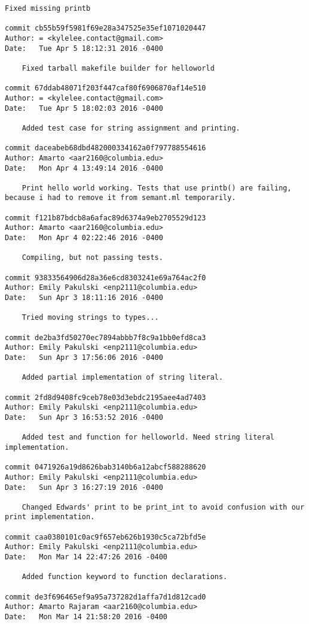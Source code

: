 \begin{lstlisting}[backgroundcolor=\color{white}]
    Fixed missing printb

commit cb55b59f5981f69e28a347525e35ef1071020447
Author: = <kylelee.contact@gmail.com>
Date:   Tue Apr 5 18:12:31 2016 -0400

    Fixed tarball makefile builder for helloworld

commit 67ddab48071f203f447caf80f6906870af14e510
Author: = <kylelee.contact@gmail.com>
Date:   Tue Apr 5 18:02:03 2016 -0400

    Added test case for string assignment and printing.

commit daceabeb68dbd482000334162a0f797788554616
Author: Amarto <aar2160@columbia.edu>
Date:   Mon Apr 4 13:49:14 2016 -0400

    Print hello world working. Tests that use printb() are failing, because i had to remove it from semant.ml temporarily.

commit f121b87bdcb8a6afac89d6374a9eb2705529d123
Author: Amarto <aar2160@columbia.edu>
Date:   Mon Apr 4 02:22:46 2016 -0400

    Compiling, but not passing tests.

commit 93833564906d28a36e6cd8303241e69a764ac2f0
Author: Emily Pakulski <enp2111@columbia.edu>
Date:   Sun Apr 3 18:11:16 2016 -0400

    Tried moving strings to types...

commit de2ba3fd50270ec7894abbb7f8c9a1bb0efd8ca3
Author: Emily Pakulski <enp2111@columbia.edu>
Date:   Sun Apr 3 17:56:06 2016 -0400

    Added partial implementation of string literal.

commit 2fd8d9408fc9ceb78e03d3ebdc2195aee4ad7403
Author: Emily Pakulski <enp2111@columbia.edu>
Date:   Sun Apr 3 16:53:52 2016 -0400

    Added test and function for helloworld. Need string literal implementation.

commit 0471926a19d8626bab3140b6a12abcf588288620
Author: Emily Pakulski <enp2111@columbia.edu>
Date:   Sun Apr 3 16:27:19 2016 -0400

    Changed Edwards' print to be print_int to avoid confusion with our print implementation.

commit caa0380101c0ac9f657eb626b1930c5ca72bfd5e
Author: Emily Pakulski <enp2111@columbia.edu>
Date:   Mon Mar 14 22:47:26 2016 -0400

    Added function keyword to function declarations.

commit de3f696465ef9a95a737282d1affa7d1d812cad0
Author: Amarto Rajaram <aar2160@columbia.edu>
Date:   Mon Mar 14 21:58:20 2016 -0400


\end{lstlisting}
